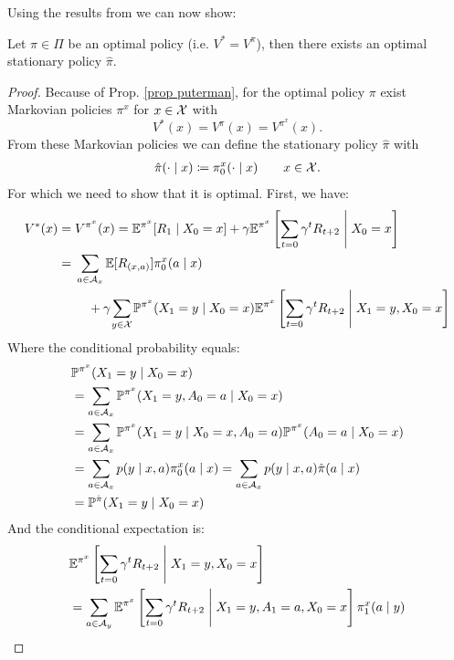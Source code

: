 Using the results from \citeauthor{putermanMarkovDecisionProcesses2005} we can now show:
\begin{thm}\label{optimal policy => opt stat policy}
	Let \(\pi\in\Pi\) be an optimal policy (i.e. \(V^*=V^\pi\)), then there exists an optimal stationary policy \(\hat{\pi}\).
\end{thm}
\begin{proof}
	Because of Prop. \ref{prop puterman}, for the optimal policy \(\pi\) exist Markovian policies \(\pi^x\) for \(x\in\mathcal{X}\) with
	\[
		V^*(x)=V^\pi(x)=V^{\pi^x}(x).
	\]
	From these Markovian policies we can define the stationary policy \(\hat{\pi}\) with
	\begin{align*}
		\hat{\pi}(\cdot\mid x)\coloneqq \pi_0^x(\cdot\mid x) \qquad x\in\mathcal{X}.
	\end{align*}
	For which we need to show that it is optimal. First, we have:
	\begin{align}
		V^*(x)&=V^{\pi^x}(x)=\E^{\pi^x}[R_1\mid X_0=x] 
		+ \gamma \E^{\pi^x}\left[\sum_{t=0}\gamma^t R_{t+2}\;\middle|\; X_0=x \right] \nonumber\\
		&=\begin{aligned}[t]
			&\sum_{a\in\cA_x}\E[R_{(x,a)}]\pi_0^x(a\mid x)\\
			&\quad + \gamma \smashoperator{\sum_{y\in\cX}}\Pr^{\pi^x}(X_1=y\mid X_0=x)
			\E^{\pi^x}\left[\sum_{t=0}\gamma^t R_{t+2}\;\middle|\; X_1=y, X_0=x\right]\label{V^pi^x expanded}
		\end{aligned}
	\end{align}
	Where the conditional probability equals:
	\begin{align}
		&\mathbb{P}^{\pi^x}(X_1=y\mid X_0=x) \nonumber \\
		&=\sum_{a\in\mathcal{A}_x} \mathbb{P}^{\pi^x}(X_1=y, A_0=a \mid X_0=x) \nonumber\\
		&=\sum_{a\in\mathcal{A}_x} \mathbb{P}^{\pi^x}(X_1=y\mid X_0=x, A_0=a) \mathbb{P}^{\pi^x}(A_0=a\mid X_0=x)\nonumber\\
		&=\sum_{a\in\mathcal{A}_x} p(y\mid x,a) \pi^x_0(a\mid x)
		=\sum_{a\in\mathcal{A}_x} p(y\mid x,a) \hat{\pi}(a\mid x) \nonumber\\
		&=\mathbb{P}^{\hat{\pi}}(X_1=y\mid X_0=x)
	\end{align}
	And the conditional expectation is:
	\begin{align}
		&\E^{\pi^x}\left[\sum_{t=0}\gamma^t R_{t+2}\;\middle|\; X_1=y, X_0=x\right]\nonumber\\
		&=\sum_{a\in\cA_y}
		\E^{\pi^x}\left[\sum_{t=0}\gamma^t R_{t+2}\;\middle|\; X_1=y, A_1=a, X_0=x\right]\pi^x_1(a\mid y)\nonumber\\

\end{align}
\end{proof}
